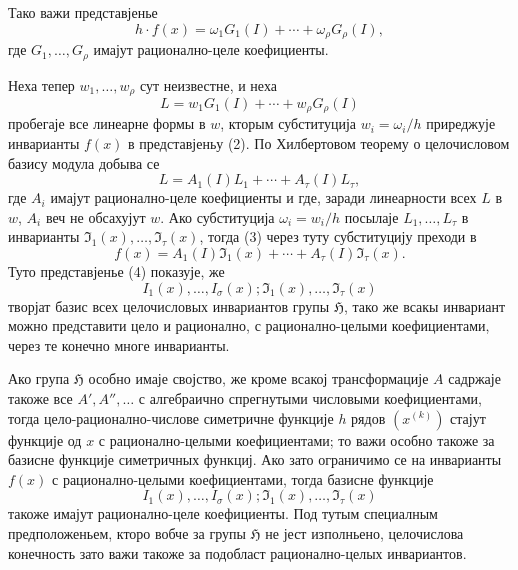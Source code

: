 ﻿\documentclass[11pt]{article}
\providecommand{\frH}{\mathfrak H}
\begin{document}
Тако важи представјенье
\begin{equation}
        h\cdot f(x)=\omega_1G_1(I)+\cdots+\omega_\rho G_\rho(I),
\end{equation}
где \(G_1,\ldots,G_\rho\) имајут рационално-целе коефициенты.

Неха тепер \(w_1,\ldots,w_\rho\) сут неизвестне, и неха
\[
        L=w_1G_1(I)+\cdots+w_\rho G_\rho(I)
\]
пробегаје все линеарне формы в \(w\), кторым субституција \(w_i=\omega_i/h\) приреджује инварианты \(f(x)\) в представјеньу (2). По Хилбертовом теорему о целочисловом базису модула добыва се
\begin{equation}
        L=A_1(I)L_1+\cdots+A_\tau(I)L_\tau,
\end{equation}
где \(A_i\) имајут рационално-целе коефициенты и где, заради линеарности всех \(L\) в \(w\), \(A_i\) веч не обсахујут \(w\). Ако субституција \(\omega_i=w_i/h\) посылаје \(L_1,\ldots,L_\tau\) в инварианты \(\mathfrak I_1(x),\ldots,\mathfrak I_\tau(x)\), тогда (3) через туту субституцију преходи в
\begin{equation}
        f(x)=A_1(I)\mathfrak I_1(x)+\cdots+A_\tau(I)\mathfrak I_\tau(x).
\end{equation}
Туто представјенье (4) показује, же
\[
        I_1(x),\ldots,I_\sigma(x);\mathfrak I_1(x),\ldots,\mathfrak I_\tau(x)
\]
творјат базис всех целочисловых инвариантов групы \(\frH\), тако же всакы инвариант можно представити цело и рационално, с рационално-целыми коефициентами, через те конечно многе инварианты.

Ако група \(\frH\) особно имаје својство, же кроме всакој трансформације \(A\) садржаје такоже все \(A',A'',\ldots\) с алгебраично спрегнутыми числовыми коефициентами, тогда цело-рационално-числове симетричне функције \(h\) рядов \((x^{(k)})\) стајут функције од \(x\) с рационално-целыми коефициентами; то важи особно такоже за базисне функције симетричных функциј. Ако зато ограничимо се на инварианты \(f(x)\) с рационално-целыми коефициентами, тогда базисне функције
\[
        I_1(x),\ldots,I_\sigma(x);\mathfrak I_1(x),\ldots,\mathfrak I_\tau(x)
\]
такоже имајут рационално-целе коефициенты. Под тутым специалным предположеньем, кторо вобче за групы \(\frH\) не јест изполньено, целочислова конечность зато важи такоже за подобласт рационално-целых инвариантов.
\end{document}
